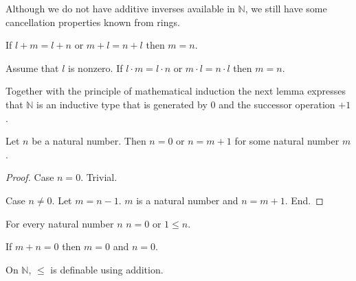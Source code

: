 \documentclass{article}
\begin{document}
Although we do not have additive inverses available in
$\mathbb{N}$, we still have some cancellation properties
known from rings.
\begin{forthel}
\begin{lemma}
If $l + m = l + n$ or $m + l = n + l$ then $m = n$.
\end{lemma}

\begin{lemma}
Assume that $l$ is nonzero.
If $l \cdot m = l \cdot n$ or $m \cdot l = n \cdot l$ then $m = n$.
\end{lemma}
\end{forthel}
%
Together with the principle of mathematical induction the next
lemma expresses that $\mathbb{N}$ is an inductive type that
is generated by $0$ and the successor operation $+1$.
%
\begin{forthel}
\begin{lemma} Let $n$ be a natural number. Then
$n = 0$ or $n = m + 1$ for some natural number $m$.
\end{lemma}
\begin{proof}
Case $n = 0$. Trivial.

Case $n \neq 0$. Let $m = n - 1$. $m$ is a natural number and
$n = m + 1$. End.
\end{proof}

\begin{lemma}
For every natural number $n$ $n = 0$ or $1 \leq n$.
\end{lemma}

\begin{lemma}
If $m + n = 0$ then $m = 0$ and $n = 0$.
\end{lemma}
\end{forthel}
%
On $\mathbb{N}$, $\leq$ is definable using addition.
%
\end{document}
